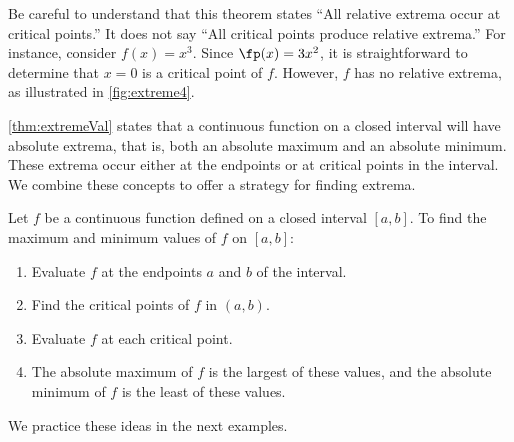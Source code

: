 Be careful to understand that this theorem states  ``All relative extrema occur at critical points.'' It does not say ``All critical points produce relative extrema.'' For instance, consider $f(x) = x^3$. Since $\fp(x) = 3x^2$, it is straightforward to determine that $x=0$ is a critical point of $f$. However, $f$ has no relative extrema, as illustrated in \autoref{fig:extreme4}.\bigskip

\autoref{thm:extremeVal} states that a continuous function on a closed interval will have absolute extrema, that is, both an absolute maximum and an absolute minimum. These extrema occur either at the endpoints or at critical points in the interval. We combine these concepts to offer a strategy for finding extrema.

%
{Let $f$ be a continuous function defined on a closed interval $[a,b]$. To find the maximum and minimum values of $f$ on $[a,b]$:
	\begin{enumerate}
	\item		Evaluate $f$ at the endpoints $a$ and $b$ of the interval.
	\item		Find the critical points of $f$ in $(a,b)$.
	\item		Evaluate $f$ at each critical point.
	\item		The absolute maximum of $f$ is the largest of these values, and the absolute minimum of $f$ is the least of these values.
	\end{enumerate}}

We practice these ideas in the next examples.

